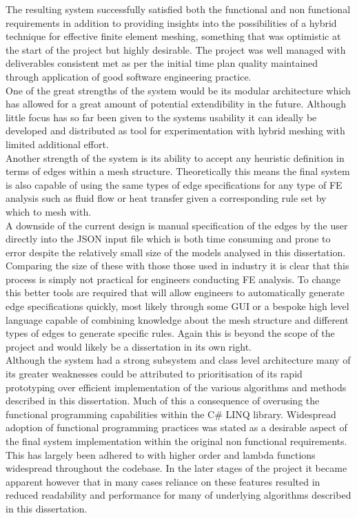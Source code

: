 The resulting system successfully satisfied both the functional and non functional requirements in addition to providing insights into the possibilities of a hybrid technique for effective finite element meshing, something that was optimistic at the start of the project but highly desirable. The project was well managed with deliverables consistent met as per the initial time plan quality maintained through application of good software engineering practice. \\
 


\noindent
One of the great strengths of the system would be its modular architecture which has allowed for a great amount of potential extendibility in the future. Although little focus has so far been given to the systems usability it can ideally be developed and distributed as tool for experimentation with hybrid meshing with limited additional effort. \\

\noindent
Another strength of the system is its ability to accept any heuristic definition in terms of edges within a mesh structure. Theoretically this means the final system is also capable of using the same types of edge specifications for any type of FE analysis such as fluid flow or heat transfer given a corresponding rule set by which to mesh with. \\


\noindent
A downside of the current design is manual specification of the edges by the user directly into the JSON input file which is both time consuming and prone to error despite the relatively small size of the models analysed in this dissertation. Comparing the size of these with those those used in industry it is clear that this process is simply not practical for engineers conducting FE analysis. To change this better tools are required that will allow engineers to automatically generate edge specifications quickly, most likely through some GUI or a bespoke high level language capable of combining knowledge about the mesh structure and different types of edges to generate specific rules. Again this is beyond the scope of the project and would likely be a dissertation in its own right. \\


\noindent
Although the system had a strong subsystem and class level architecture many of its greater weaknesses could be attributed to prioritisation of its rapid prototyping over efficient implementation of the various algorithms and methods described in this dissertation. Much of this a consequence of overusing the functional programming capabilities within the C\# LINQ library. Widespread adoption of functional programming practices was stated as a desirable aspect of the final system implementation within the original non functional requirements. This has largely been adhered to with  higher order and lambda functions widespread throughout the codebase. In the later stages of the project it became apparent however that in many cases reliance on these features resulted in reduced readability and performance for many of underlying algorithms described in this dissertation. \\

